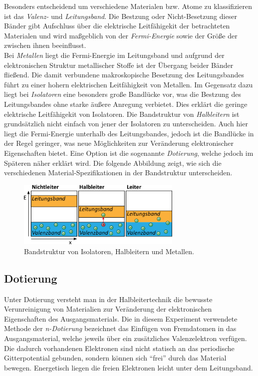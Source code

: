 \noindent Besonders entscheidend um verschiedene Materialen bzw. Atome zu klassifizieren ist das \textit{Valenz-} und \textit{Leitungsband}. Die Bestzung 
oder Nicht-Besetzung dieser Bänder gibt Aufschluss über die elektrische Leitfähigekit der betrachteten Materialen und wird maßgeblich von der 
\textit{Fermi-Energie} sowie der Größe der  zwischen ihnen beeinflusst. \\

\noindent Bei \textit{Metallen} liegt die Fermi-Energie im Leitungsband und aufgrund der elektronischen Struktur metallischer Stoffe ist der Übergang beider 
Bänder fließend. Die damit verbundene makroskopische Besetzung des Leitungsbandes führt zu einer hohern elektrischen Leitfähigkeit von Metallen.
Im Gegensatz dazu liegt bei \textit{Isolatoren} eine besonders große Bandlücke vor, was die Bestzung des Leitungsbandes ohne starke äußere Anregung verbietet.
Dies erklärt die geringe elektrische Leitfähigekit von Isolatoren. Die Bandstruktur von \textit{Halbleitern} ist grundsätzlich nicht einfach von jener der 
Isolatoren zu unterscheiden. Auch hier liegt die Fermi-Energie unterhalb des Leitungsbandes, jedoch ist die Bandlücke in der Regel geringer, was neue 
Möglichkeiten zur Veränderung elektronischer Eigenschaften bietet. Eine Option ist die sogenannte \textit{Dotierung}, welche jedoch im Späteren 
näher erklärt wird. Die folgende Abbildung zeigt, wie sich die verschiedenen Material-Spezifikationen in der Bandstruktur unterscheiden. \\

\begin{figure}[H]
    \centering
    \includegraphics[width=0.7\textwidth]{MetIsoHalb.png}
    \caption{Bandstruktur von Isolatoren, Halbleitern und Metallen.}
    \label{fig:MetIsoHalb}
\end{figure}

\subsection{Dotierung}

\noindent Unter Dotierung versteht man in der Halbleitertechnik die bewusste Verunreinigung von Materialien zur Veränderung
der elektronischen Eigenschaften des Ausgangsmaterials. Die in diesem Experiment verwendete Methode der \textit{n-Dotierung}
bezeichnet das Einfügen von Fremdatomen in das Ausgangsmaterial, welche jeweils über ein zusätzliches Valenzelektron verfügen. 
Die dadurch vorhandenen Elektronen sind nicht statisch an das periodische Gitterpotential gebunden, sondern können sich \enquote{frei} 
durch das Material bewegen. Energetisch liegen die freien Elektronen leicht unter dem Leitungsband.

